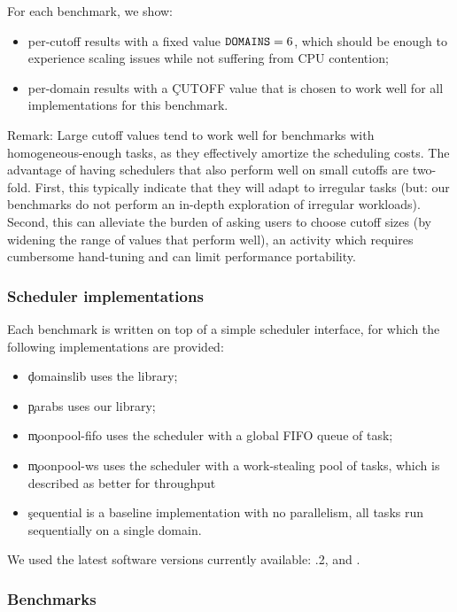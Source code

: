 For each benchmark, we show:
\begin{itemize}
  \item
    per-cutoff results with a fixed value $\texttt{DOMAINS} = 6$, which should be enough to experience scaling issues while not suffering from CPU contention;
  \item
    per-domain results with a \c{CUTOFF} value that is chosen to work well for all implementations for this benchmark.
\end{itemize}

Remark: Large cutoff values tend to work well for benchmarks with homogeneous-enough tasks, as they effectively amortize the scheduling costs. The advantage of having schedulers that also perform well on small cutoffs are two-fold. First, this typically indicate that they will adapt to irregular tasks (but: our benchmarks do not perform an in-depth exploration of irregular workloads). Second, this can alleviate the burden of asking users to choose cutoff sizes (by widening the range of values that perform well), an activity which requires cumbersome hand-tuning and can limit performance portability.

\subsubsection{Scheduler implementations}

Each benchmark is written on top of a simple scheduler interface, for which the following implementations are provided:
\begin{itemize}
  \item
    \c{domainslib} uses the \Domainslib library;
  \item
    \c{parabs} uses our \Parabs library;
  \item
    \c{moonpool-fifo} uses the \Moonpool scheduler with a global FIFO queue of task;
  \item
    \c{moonpool-ws} uses the \Moonpool scheduler with a work-stealing pool of tasks,
    which is described as better for throughput
  \item
    \c{sequential} is a baseline implementation with no parallelism, all tasks run sequentially on a single domain.
\end{itemize}

We used the latest software versions currently available: .2, and .

\subsubsection{Benchmarks}

